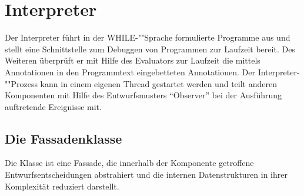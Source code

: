 \section{Interpreter}

Der Interpreter führt in der WHILE-""Sprache formulierte Programme aus und stellt eine Schnittstelle zum Debuggen von Programmen zur Laufzeit bereit. Des Weiteren überprüft er mit Hilfe des Evaluators zur Laufzeit die mittels Annotationen in den Programmtext eingebetteten Annotationen. Der Interpreter-""Prozess kann in einem eigenen Thread gestartet werden und teilt anderen Komponenten mit Hilfe des Entwurfsmusters ``Observer'' bei der Ausführung auftretende Ereignisse mit.

\subsection{Die Fassadenklasse }
Die Klasse  ist eine Fassade, die innerhalb der Komponente getroffene Entwurfsentscheidungen abstrahiert und die internen Datenstrukturen in ihrer Komplexität reduziert darstellt.

